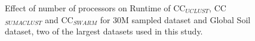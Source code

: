 \documentclass[10pt, conference, compsocconf]{IEEEtran}
\begin{document}
\begin{figure}[t]	
	\begin{minipage}[t]{0.5\linewidth}
	\end{minipage}%
	\hfill%
	\begin{minipage}[t]{0.5\linewidth}
	\end{minipage}	
	\caption{Effect of number of processors on Runtime of CC$_{UCLUST}$, CC$_{SUMACLUST}$ and CC$_{SWARM}$ for 30M sampled dataset and Global Soil dataset, two of the largest datasets used in this study.}
\end{figure}
\end{document}
